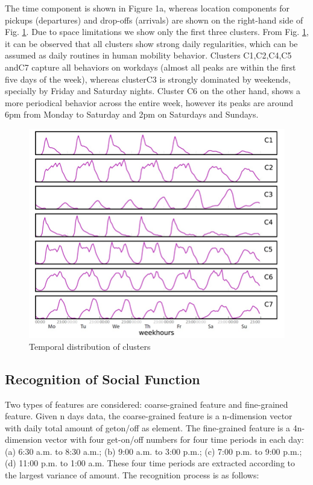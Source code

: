 \documentclass[a4paper, 10pt, conference]{ieeeconf}      %
\begin{document}
The time component is shown in Figure 1a, whereas location components for pickups (departures) and drop-offs (arrivals) are shown on the right-hand side of Fig. \ref{fig:my_png_9}. Due to space limitations we show only the first three clusters. From Fig. \ref{fig:my_png_9}, it can be observed that all clusters show strong daily regularities, which can be assumed as daily routines in human mobility behavior. Clusters C1,C2,C4,C5 andC7 capture all behaviors on workdays (almost all peaks are within the first five days of the week), whereas clusterC3 is strongly dominated by weekends, specially by Friday and Saturday nights. Cluster C6 on the other hand, shows a more periodical behavior across the entire week, however its peaks are around 6pm from Monday to Saturday and 2pm on Saturdays and Sundays.

\begin{figure}[htpb]
    \centering
    \includegraphics{fig/png9.png}
    \caption{Temporal distribution of clusters}
    \label{fig:my_png_9}
\end{figure}

\subsection{Recognition of Social Function}Two types of features are considered: coarse-grained feature and fine-grained feature. Given n days data, the coarse-grained feature is a n-dimension vector with daily total amount of geton/off as element. The fine-grained feature is a 4n-dimension vector with four get-on/off numbers for four time periods in each day: (a) 6:30 a.m. to 8:30 a.m.; (b) 9:00 a.m. to 3:00 p.m.; (c) 7:00 p.m. to 9:00 p.m.; (d) 11:00 p.m. to 1:00 a.m. These four time periods are extracted according to the largest variance of amount. The recognition process is as follows:
\end{document}
